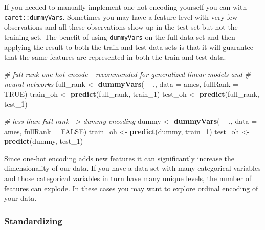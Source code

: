 \documentclass[]{book}
\newenvironment{Shaded}{\begin{snugshade}}{\end{snugshade}}
\newcommand{\CommentTok}[1]{\textcolor[rgb]{0.56,0.35,0.01}{\textit{#1}}}
\newcommand{\DataTypeTok}[1]{\textcolor[rgb]{0.13,0.29,0.53}{#1}}
\newcommand{\DecValTok}[1]{\textcolor[rgb]{0.00,0.00,0.81}{#1}}
\newcommand{\KeywordTok}[1]{\textcolor[rgb]{0.13,0.29,0.53}{\textbf{#1}}}
\newcommand{\NormalTok}[1]{#1}
\newcommand{\OperatorTok}[1]{\textcolor[rgb]{0.81,0.36,0.00}{\textbf{#1}}}
\newcommand{\OtherTok}[1]{\textcolor[rgb]{0.56,0.35,0.01}{#1}}
\newcommand{\StringTok}[1]{\textcolor[rgb]{0.31,0.60,0.02}{#1}}
\theoremstyle{definition}
\theoremstyle{definition}
\theoremstyle{definition}
\theoremstyle{remark}
\begin{document}
If you needed to manually implement one-hot encoding yourself you can
with \texttt{caret::dummyVars}. Sometimes you may have a feature level
with very few observations and all these observations show up in the
test set but not the training set. The benefit of using
\texttt{dummyVars} on the full data set and then applying the result to
both the train and test data sets is that it will guarantee that the
same features are represented in both the train and test data.

\begin{Shaded}
\begin{Highlighting}[]
\CommentTok{# full rank one-hot encode - recommended for generalized linear models and}
\CommentTok{# neural networks}
\NormalTok{full_rank  <-}\StringTok{ }\KeywordTok{dummyVars}\NormalTok{( }\OperatorTok{~}\StringTok{ }\NormalTok{., }\DataTypeTok{data =}\NormalTok{ ames, }\DataTypeTok{fullRank =} \OtherTok{TRUE}\NormalTok{)}
\NormalTok{train_oh   <-}\StringTok{ }\KeywordTok{predict}\NormalTok{(full_rank, train_}\DecValTok{1}\NormalTok{)}
\NormalTok{test_oh    <-}\StringTok{ }\KeywordTok{predict}\NormalTok{(full_rank, test_}\DecValTok{1}\NormalTok{)}

\CommentTok{# less than full rank --> dummy encoding}
\NormalTok{dummy    <-}\StringTok{ }\KeywordTok{dummyVars}\NormalTok{( }\OperatorTok{~}\StringTok{ }\NormalTok{., }\DataTypeTok{data =}\NormalTok{ ames, }\DataTypeTok{fullRank =} \OtherTok{FALSE}\NormalTok{)}
\NormalTok{train_oh <-}\StringTok{ }\KeywordTok{predict}\NormalTok{(dummy, train_}\DecValTok{1}\NormalTok{)}
\NormalTok{test_oh  <-}\StringTok{ }\KeywordTok{predict}\NormalTok{(dummy, test_}\DecValTok{1}\NormalTok{)}
\end{Highlighting}
\end{Shaded}

\begin{tip}
Since one-hot encoding adds new features it can significantly increase
the dimensionality of our data. If you have a data set with many
categorical variables and those categorical variables in turn have many
unique levels, the number of features can explode. In these cases you
may want to explore ordinal encoding of your data.
\end{tip}

\hypertarget{standardizing}{%
\subsubsection{Standardizing}\label{standardizing}}
\end{document}
